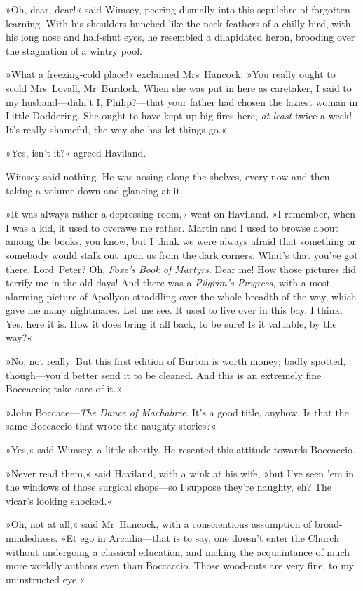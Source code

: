 »Oh, dear, dear!« said Wimsey, peering dismally into this sepulchre of forgotten learning. With his shoulders hunched like the neck-feathers of a chilly bird, with his long nose and half-shut eyes, he resembled a dilapidated heron, brooding over the stagnation of a wintry pool.

»What a freezing-cold place!« exclaimed Mrs~Hancock. »You really ought to scold Mrs~Lovall, Mr~Burdock. When she was put in here as caretaker, I said to my husband—didn't I, Philip?—that your father had chosen the laziest woman in Little Doddering. She ought to have kept up big fires here, \textit{at least} twice a week! It's really shameful, the way she has let things go.«

»Yes, isn't it?« agreed Haviland.

Wimsey said nothing. He was nosing along the shelves, every now and then taking a volume down and glancing at it.

»It was always rather a depressing room,« went on Haviland. »I remember, when I was a kid, it used to overawe me rather. Martin and I used to browse about among the books, you know, but I think we were always afraid that something or somebody would stalk out upon us from the dark corners. What's that you've got there, Lord~Peter? Oh, \textit{Foxe's Book of Martyrs}. Dear me! How those pictures did terrify me in the old days! And there was a \textit{Pilgrim's Progress}, with a most alarming picture of Apollyon straddling over the whole breadth of the way, which gave me many nightmares. Let me see. It used to live over in this bay, I think. Yes, here it is. How it does bring it all back, to be sure! Is it valuable, by the way?«

»No, not really. But this first edition of Burton is worth money; badly spotted, though—you'd better send it to be cleaned. And this is an extremely fine Boccaccio; take care of it.«

»John Boccace—\textit{The Dance of Machabree}. It's a good title, anyhow. Is that the same Boccaccio that wrote the naughty stories?«

»Yes,« said Wimsey, a little shortly. He resented this attitude towards Boccaccio.

»Never read them,« said Haviland, with a wink at his wife, »but I've seen 'em in the windows of those surgical shops—so I suppose they're naughty, eh? The vicar's looking shocked.«

»Oh, not at all,« said Mr~Hancock, with a conscientious assumption of broad-mindedness. »Et ego in Arcadia—that is to say, one doesn't enter the Church without undergoing a classical education, and making the acquaintance of much more worldly authors even than Boccaccio. Those wood-cuts are very fine, to my uninstructed eye.«

